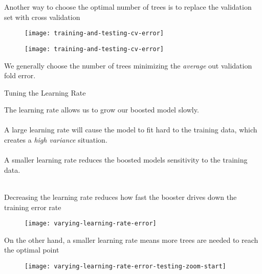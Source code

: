 %
\begin{frame}
Another way to choose the optimal number of trees is to replace the validation set with cross validation

  \begin{figure}
    \texttt{[image: training-and-testing-cv-error]}
  \end{figure}
  
\end{frame}
%
\begin{frame}

  \begin{figure}
    \texttt{[image: training-and-testing-cv-error]}
  \end{figure}
  
We generally choose the number of trees minimizing the \textit{average} out validation fold error.

\end{frame}
%
\begin{frame}{Tuning the Learning Rate}

The learning rate allows us to grow our boosted model slowly.\\~\\

A large learning rate will cause the model to fit hard to the training data, which creates a \textit{high variance} situation.\\~\\

A smaller learning rate reduces the boosted models sensitivity to the training data.\\~\\

\end{frame}
%
\begin{frame}
Decreasing the learning rate reduces how fast the booster drives down the training error rate
  \begin{figure}
    \texttt{[image: varying-learning-rate-error]}
  \end{figure}
  
\end{frame}
%
\begin{frame}
On the other hand, a smaller learning rate means more trees are needed to reach the optimal point

  \begin{figure}
    \texttt{[image: varying-learning-rate-error-testing-zoom-start]}
  \end{figure}
  
\end{frame}
